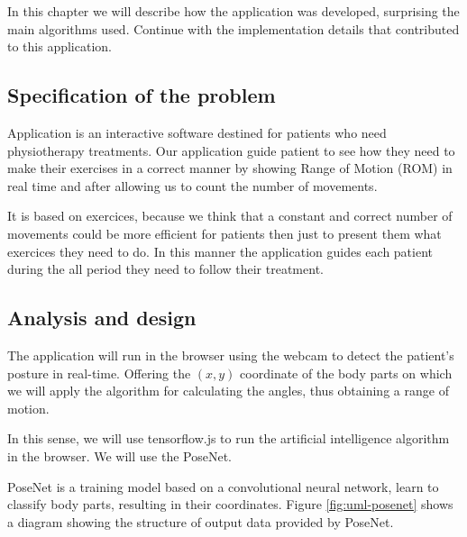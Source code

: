 In this chapter we will describe how the application was developed, surprising the main algorithms used.
Continue with the implementation details that contributed to this application.


\subsection{Specification of the problem}

Application is an interactive software destined for patients who need physiotherapy
treatments. Our application guide patient to see how they need to make their exercises in 
a correct manner by showing Range of Motion (ROM) in real time and after allowing us to 
 count the number of movements. 
 
It is based on exercices, because we think that a constant and correct number of movements could be more efficient for patients then just to present them what exercices they need to do. In this manner the application guides each patient during the all period they need to follow their treatment. 

\subsection{Analysis and design}

The application will run in the browser using the webcam to detect the patient's posture in real-time.
Offering the $(x, y)$ coordinate of the body parts on which we will apply the algorithm for calculating the angles, thus obtaining a range of motion.

In this sense, we will use tensorflow.js to run the artificial intelligence algorithm in the browser.
We will use the PoseNet.

PoseNet is a training model based on a convolutional neural network, learn to classify body parts, resulting in their coordinates. Figure \ref{fig:uml-posenet} shows a diagram showing the structure of output data provided by PoseNet.

